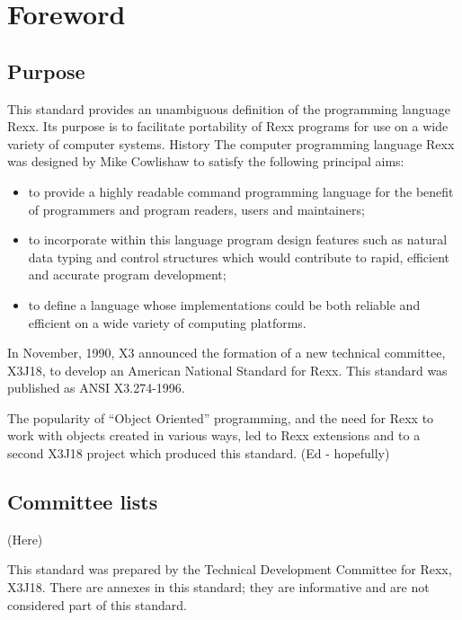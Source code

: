 \hypertarget{foreword}{%
\chapter{Foreword}\label{foreword}}

\hypertarget{purpose}{%
\section{Purpose}\label{purpose}}

This standard provides an unambiguous definition of the programming
language Rexx. Its purpose is to facilitate portability of Rexx programs
for use on a wide variety of computer systems. History The computer
programming language Rexx was designed by Mike Cowlishaw to satisfy the
following principal aims:

\begin{itemize}
\item
  to provide a highly readable command programming language for the
  benefit of programmers and program readers, users and maintainers;
\item
  to incorporate within this language program design features such as
  natural data typing and control structures which would contribute to
  rapid, efficient and accurate program development;
\item
  to define a language whose implementations could be both reliable and
  efficient on a wide variety of computing platforms.
\end{itemize}

In November, 1990, X3 announced the formation of a new technical
committee, X3J18, to develop an American National Standard for Rexx.
This standard was published as ANSI X3.274-1996.

The popularity of ``Object Oriented'' programming, and the need for Rexx
to work with objects created in various ways, led to Rexx extensions and
to a second X3J18 project which produced this standard. (Ed - hopefully)

\hypertarget{committee-lists}{%
\section{Committee lists}\label{committee-lists}}

(Here)

This standard was prepared by the Technical Development Committee for
Rexx, X3J18. There are annexes in this standard; they are informative
and are not considered part of this standard.

